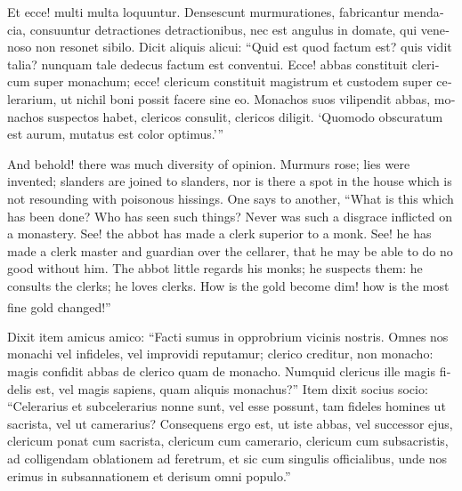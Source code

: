 \documentclass[10pt]{book}
\newcounter{engnote}
\newcommand{\engnotenum}{\textsuperscript{\arabic{engnote}\stepcounter{engnote}}}
\newcommand{\engnotetext}[1]{\vphantom{\footnotemark{}}\footnotetext{#1}}
\begin{document}
\begin{paracol}{2}
\begin{otherlanguage}{latin}
Et ecce! multi multa loquuntur. Densescunt murmurationes, fabricantur mendacia, consuuntur detractiones detractionibus, nec est angulus in domate, qui venenoso non resonet sibilo. Dicit aliquis alicui: ``Quid est quod factum est? quis vidit talia? nunquam tale dedecus factum est conventui. Ecce! abbas constituit clericum super monachum; ecce! clericum constituit magistrum et custodem super celerarium, ut nichil boni possit facere sine eo. Monachos suos vilipendit abbas, monachos suspectos habet, clericos consulit, clericos diligit. `Quomodo obscuratum est aurum, mutatus est color optimus.'\hspace{1pt}''\engnotetext{Lament.\ iv., \oldstylenums{1}.}
\end{otherlanguage}

\switchcolumn

And behold! there was much diversity of opinion. Murmurs rose; lies were invented; slanders are joined to slanders, nor is there a spot in the house which is not resounding with poisonous hissings. One says to another, ``What is this which has been done? Who has seen such things? Never was such a disgrace inflicted on a monastery. See! the abbot has made a clerk superior to a monk. See! he has made a clerk master and guardian over the cellarer, that he may be able to do no good without him. The abbot little regards his monks; he suspects them: he consults the clerks; he loves clerks. How is the gold become dim! how is the most fine gold changed!''\engnotenum{}

\switchcolumn*

\begin{otherlanguage}{latin}
Dixit item amicus amico: ``Facti sumus in opprobrium vicinis nostris. Omnes nos monachi vel infideles, vel improvidi reputamur; clerico creditur, non monacho: magis confidit abbas de clerico quam de monacho. Numquid clericus ille magis fidelis est, vel magis sapiens, quam aliquis monachus?'' Item dixit socius socio: ``Celerarius et subcelerarius nonne sunt, vel esse possunt, tam fideles homines ut sacrista, vel ut camerarius? Consequens ergo est, ut iste abbas, vel successor ejus, clericum ponat cum sacrista, clericum cum camerario, clericum cum subsacristis, ad colligendam oblationem ad feretrum, et sic cum singulis officialibus, unde nos erimus in subsannationem et derisum omni populo.''
\end{otherlanguage}

\switchcolumn


\end{paracol}
\end{document}

